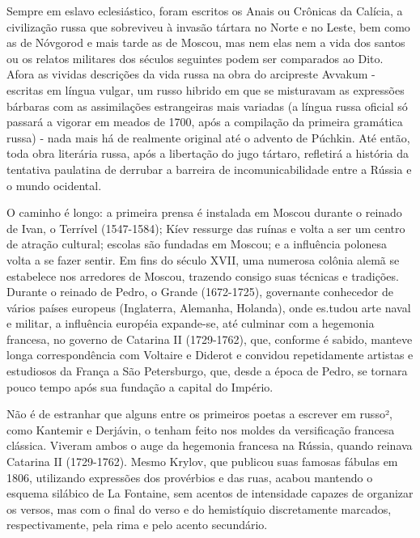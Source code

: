 Sempre em eslavo eclesiástico, foram escritos os Anais ou Crônicas da
Calícia, a civilização russa que sobreviveu à invasão tártara no Norte e
no Leste, bem como as de Nóvgorod e mais tarde as de Moscou, mas nem
elas nem a vida dos santos ou os relatos militares dos séculos seguintes
podem ser comparados ao Dito. Afora as vividas descrições da vida russa
na obra do arcipreste Avvakum - escritas em língua vulgar, um russo
hibrido em que se misturavam as expres­sões bárbaras com as assimilações
estrangeiras mais variadas (a língua russa oficial só passará a vigorar
em meados de 1700, após a compilação da primeira gramática russa) - nada
mais há de realmente original até o advento de Púchkin. Até então, toda
obra literária russa, após a libertação do jugo tártaro, refletirá a
história da tentativa paulatina de derrubar a barreira de
incomunicabilidade entre a Rússia e o mundo ocidental.

O caminho é longo: a primeira prensa é instalada em Moscou durante o
rei­nado de Ivan, o Terrível (1547-1584); Kíev ressurge das ruínas e
volta a ser um centro de atração cultural; escolas são fundadas em
Moscou; e a influência po­lonesa volta a se fazer sentir. Em fins do
século XVII, uma numerosa colônia alemã se estabelece nos arredores de
Moscou, trazendo consigo suas técnicas e tradições. Durante o reinado de
Pedro, o Grande (1672-1725), governante co­nhecedor de vários países
europeus (Inglaterra, Alemanha, Holanda), onde es­.tudou arte naval e
militar, a influência européia expande-se, até culminar com a hegemonia
francesa, no governo de Catarina II (1729-1762), que, conforme é sabido,
manteve longa correspondência com Voltaire e Diderot e convidou
re­petidamente artistas e estudiosos da França a São Petersburgo, que,
desde a épo­ca de Pedro, se tornara pouco tempo após sua fundação a
capital do Império.

Não é de estranhar que alguns entre os primeiros poetas a escrever em
rus­so², como Kantemir e Derjávin, o tenham feito nos moldes da
versificação fran­cesa clássica. Viveram ambos o auge da hegemonia
francesa na Rússia, quando reinava Catarina II (1729-1762). Mesmo
Krylov, que publicou suas famosas fábulas em 1806, utilizando expressões
dos provérbios e das ruas, acabou man­tendo o esquema silábico de La
Fontaine, sem acentos de intensidade capazes de organizar os versos, mas
com o final do verso e do hemistíquio discreta­mente marcados,
respectivamente, pela rima e pelo acento secundário.

